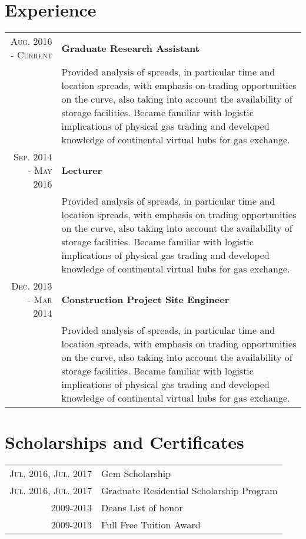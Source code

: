 \documentclass[a4paper,10pt]{article}
\begin{document}
\section{Experience}
\begin{tabular}{rp{11cm}}
 
 \textsc{Aug. 2016 - Current} &\textbf{Graduate Research Assistant}\\
 & Provided analysis of spreads, in particular time and location spreads, with emphasis on trading opportunities on the curve, also taking into account the availability of storage facilities. Became familiar with logistic implications of physical gas trading and developed knowledge of continental virtual hubs for gas exchange.\\
 
 \textsc{Sep. 2014 - May 2016}&\textbf{Lecturer}\\
 &Provided analysis of spreads, in particular time and location spreads, with emphasis on trading opportunities on the curve, also taking into account the availability of storage facilities. Became familiar with logistic implications of physical gas trading and developed knowledge of continental virtual hubs for gas exchange.\\
  
  \textsc{Dec. 2013 - Mar 2014}&\textbf{Construction Project Site Engineer}\\
 &Provided analysis of spreads, in particular time and location spreads, with emphasis on trading opportunities on the curve, also taking into account the availability of storage facilities. Became familiar with logistic implications of physical gas trading and developed knowledge of continental virtual hubs for gas exchange.
 \end{tabular}

\section{Scholarships and Certificates}
\begin{tabular}{rl}
 \textsc{Jul.} 2016, \textsc{Jul.} 2017 & Gem Scholarship \normalsize\\
  \textsc{Jul.} 2016, \textsc{Jul.} 2017 & Graduate Residential Scholarship Program\normalsize\\
  \textsc{2009-2013} & Deans List of honor\\
  \textsc{2009-2013} & Full Free Tuition Award\\
\end{tabular}
\end{document}
